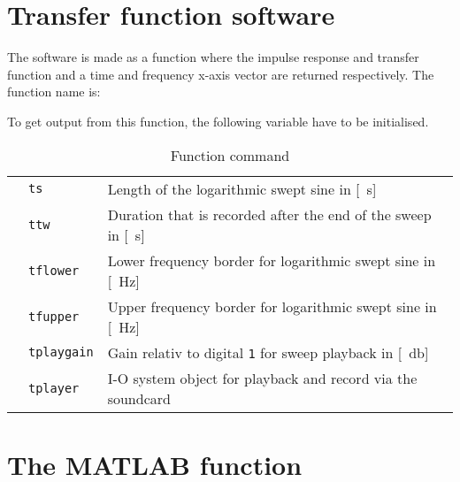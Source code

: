\section*{Transfer function software}
The software is made as a function where the impulse response and transfer function and a time and frequency x-axis vector are returned respectively. The function name is:


To get output from this function, the following variable have to be initialised.



 \begin{table}[H]
\centering
\caption{Function command}
\label{my-label}
\begin{tabular}{lll}
 & \texttt{ts} & Length of the logarithmic swept sine in {[}\SI{}{\second}{]} \\
 & \texttt{ttw} & Duration that is recorded after the end of the sweep in {[}\SI{}{\second}{]}    \\
 & \texttt{tflower} & Lower frequency border for logarithmic swept sine in {[}\SI{}{\hertz}{]}  \\
 & \texttt{tfupper} & Upper frequency border for logarithmic swept sine in {[}\SI{}{\hertz}{]} \\
 & \texttt{tplaygain} & Gain relativ to digital \texttt{1} for sweep playback in {[}\SI{}{\decibel}{]} \\
 & \texttt{tplayer}  & I-O system object for playback and record via the soundcard
\end{tabular}
\end{table}



\section*{The MATLAB function}

